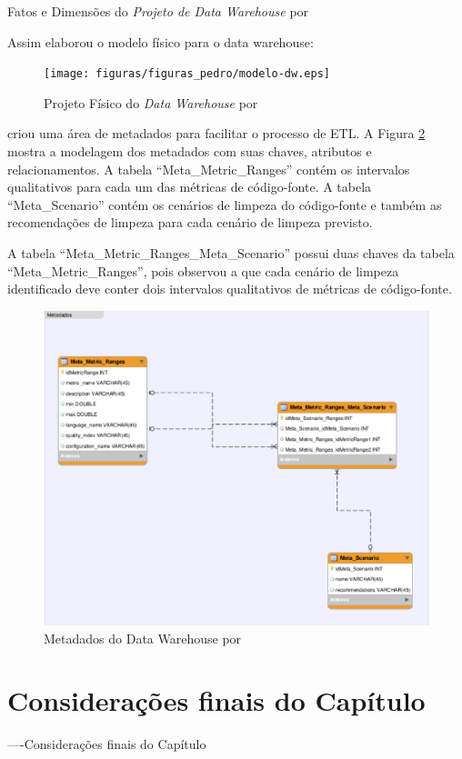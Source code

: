\begin{table}[h]
\centering

\caption{Fatos e Dimensões do \textit{Projeto de Data Warehouse} por }
\label{tab:dimensoes-fato}
\end{table}
\FloatBarrier

Assim  elaborou o modelo físico para o data warehouse:

\begin{figure}[h!]
\centering
\texttt{[image: figuras/figuras\_pedro/modelo-dw.eps]}
\caption{Projeto Físico do \textit{Data Warehouse} por }
\label{fig:project-dw}
\end{figure}
\FloatBarrier


 criou uma área de metadados para facilitar o processo de ETL. A Figura \ref{fig:metadados} mostra a modelagem dos metadados com suas chaves, atributos e relacionamentos. A tabela ``Meta\_Metric\_Ranges'' contém os intervalos qualitativos para cada um das métricas de código-fonte. A tabela ``Meta\_Scenario'' contém os cenários de limpeza do código-fonte e também as recomendações de limpeza para cada cenário de limpeza previsto.

 A tabela  ``Meta\_Metric\_Ranges\_Meta\_Scenario'' possui duas chaves da tabela ``Meta\_Metric\_Ranges'', pois  observou a que cada cenário de limpeza identificado deve conter dois intervalos qualitativos de métricas de código-fonte.


\begin{figure}[h!]
\centering
\includegraphics[keepaspectratio=true,scale=0.65]{figuras/figuras_pedro/metadados.eps}
\caption{Metadados do Data Warehouse por }
\label{fig:metadados}
\end{figure}
\FloatBarrier

\section{Considerações finais do Capítulo}

----Considerações finais do Capítulo